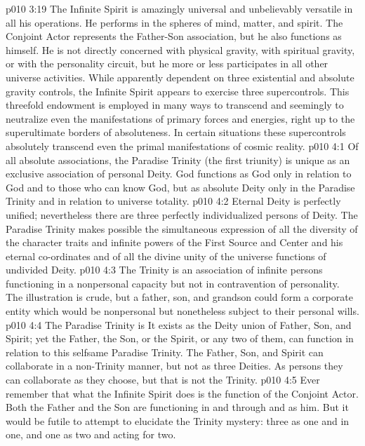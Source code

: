 \pc \vs p010 3:19 The Infinite Spirit is amazingly universal and unbelievably versatile in all his operations. He performs in the spheres of mind, matter, and spirit. The Conjoint Actor represents the Father\hyp{}Son association, but he also functions as himself. He is not directly concerned with physical gravity, with spiritual gravity, or with the personality circuit, but he more or less participates in all other universe activities. While apparently dependent on three existential and absolute gravity controls, the Infinite Spirit appears to exercise three supercontrols. This threefold endowment is employed in many ways to transcend and seemingly to neutralize even the manifestations of primary forces and energies, right up to the superultimate borders of absoluteness. In certain situations these supercontrols absolutely transcend even the primal manifestations of cosmic reality.\plusone
{}
\vs p010 4:1 Of all absolute associations, the Paradise Trinity (the first triunity) is unique as an exclusive association of personal Deity. God functions as God only in relation to God and to those who can know God, but as absolute Deity only in the Paradise Trinity and in relation to universe totality.
\pc \vs p010 4:2 Eternal Deity is perfectly unified; nevertheless there are three perfectly individualized persons of Deity. The Paradise Trinity makes possible the simultaneous expression of all the diversity of the character traits and infinite powers of the First Source and Center and his eternal co\hyp{}ordinates and of all the divine unity of the universe functions of undivided Deity.
\vs p010 4:3 The Trinity is an association of infinite persons functioning in a nonpersonal capacity but not in contravention of personality. The illustration is crude, but a father, son, and grandson could form a corporate entity which would be nonpersonal but nonetheless subject to their personal wills.
\vs p010 4:4 The Paradise Trinity is  It exists as the Deity union of Father, Son, and Spirit; yet the Father, the Son, or the Spirit, or any two of them, can function in relation to this selfsame Paradise Trinity. The Father, Son, and Spirit can collaborate in a non\hyp{}Trinity manner, but not as three Deities. As persons they can collaborate as they choose, but that is not the Trinity.
\pc \vs p010 4:5 Ever remember that what the Infinite Spirit does is the function of the Conjoint Actor. Both the Father and the Son are functioning in and through and as him. But it would be futile to attempt to elucidate the Trinity mystery: three as one and in one, and one as two and acting for two.
